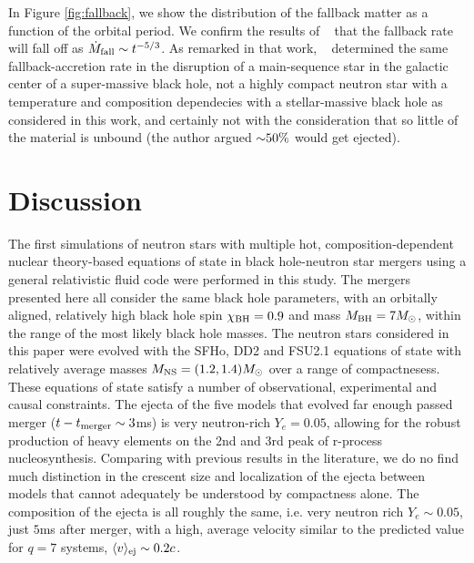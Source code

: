 In Figure \ref{fig:fallback}, we show the distribution of the fallback matter as a function of the orbital period.  We confirm the results of ~\cite{Chawla:2010sw} that the fallback rate will fall off as $\dot{M}_{\rm fall} \sim t^{-5/3}$.  As remarked in that work, ~\cite{phinney1989manifestations} determined the same fallback-accretion rate in the disruption of a main-sequence star in the galactic center of a super-massive black hole, not a highly compact neutron star with a temperature and composition dependecies with a stellar-massive black hole as considered in this work, and certainly not with the consideration that so little of the material is unbound (the author argued $\mathord{\sim} 50\%$ would get ejected).


\section{Discussion}
\label{sec:discussion}

The first simulations of neutron stars with multiple hot, composition-dependent nuclear theory-based equations of state in black hole-neutron star mergers using a general relativistic fluid code were performed in this study.  
The mergers presented here all consider the same black hole parameters, with an orbitally aligned, relatively high black hole spin $\chi_{\rm BH} = 0.9$ and  mass $M_{\rm BH} = 7 M_\odot$, within the range of the most likely black hole masses.  
The neutron stars considered in this paper were evolved with the SFHo, DD2 and FSU2.1 equations of state with relatively average masses $M_{\rm NS} = (1.2,1.4) M_\odot$ over a range of compactnesess.  
These equations of state satisfy a number of observational, experimental and causal constraints.  
The ejecta of the five models that evolved far enough passed merger ($t - t_{\rm merger} \sim 3$ms) is very neutron-rich $Y_e = 0.05$, allowing for the robust production of heavy elements on the 2nd and 3rd peak of r-process nucleosynthesis.
Comparing with previous results in the literature, we do no find much distinction in the crescent size and localization of the ejecta between models that cannot adequately be understood by compactness alone.  The composition of the ejecta is all roughly the same, i.e. very neutron rich $Y_e \sim 0.05$, just $5$ms after merger, with a high, average velocity similar to the predicted value for $q=7$ systems, $\langle v \rangle_{\rm ej} \sim 0.2 c$.

